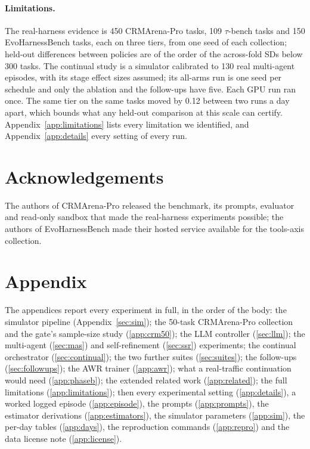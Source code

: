 \documentclass[10pt]{article}
\begin{document}
\paragraph{Limitations.} The real-harness evidence is 450 CRMArena-Pro tasks, 109 $\tau$-bench tasks and 150 EvoHarnessBench tasks, each on three tiers, from one seed of each collection; held-out differences between policies are of the order of the across-fold SDs below 300 tasks. The continual study is a simulator calibrated to 130 real multi-agent episodes, with its stage effect sizes assumed; its all-arms run is one seed per schedule and only the ablation and the follow-ups have five. Each GPU run ran once. The same tier on the same tasks moved by 0.12 between two runs a day apart, which bounds what any held-out comparison at this scale can certify. Appendix~\ref{app:limitations} lists every limitation we identified, and Appendix~\ref{app:details} every setting of every run.

\section*{Acknowledgements}
The authors of CRMArena-Pro released the benchmark, its prompts, evaluator and read-only sandbox that made the real-harness experiments possible; the authors of EvoHarnessBench made their hosted service available for the tools-axis collection.

{\small

}

\clearpage
\appendix
\section*{Appendix}
The appendices report every experiment in full, in the order of the body: the simulator pipeline (Appendix~\ref{sec:sim}); the 50-task CRMArena-Pro collection and the gate's sample-size study (\ref{app:crm50}); the LLM controller (\ref{sec:llm}); the multi-agent (\ref{sec:mas}) and self-refinement (\ref{sec:ssr}) experiments; the continual orchestrator (\ref{sec:continual}); the two further suites (\ref{sec:suites}); the follow-ups (\ref{sec:followups}); the AWR trainer (\ref{app:awr}); what a real-traffic continuation would need (\ref{app:phaseb}); the extended related work (\ref{app:related}); the full limitations (\ref{app:limitations}); then every experimental setting (\ref{app:details}), a worked logged episode (\ref{app:episode}), the prompts (\ref{app:prompts}), the estimator derivations (\ref{app:estimators}), the simulator parameters (\ref{app:sim}), the per-day tables (\ref{app:days}), the reproduction commands (\ref{app:repro}) and the data license note (\ref{app:license}).
\end{document}
